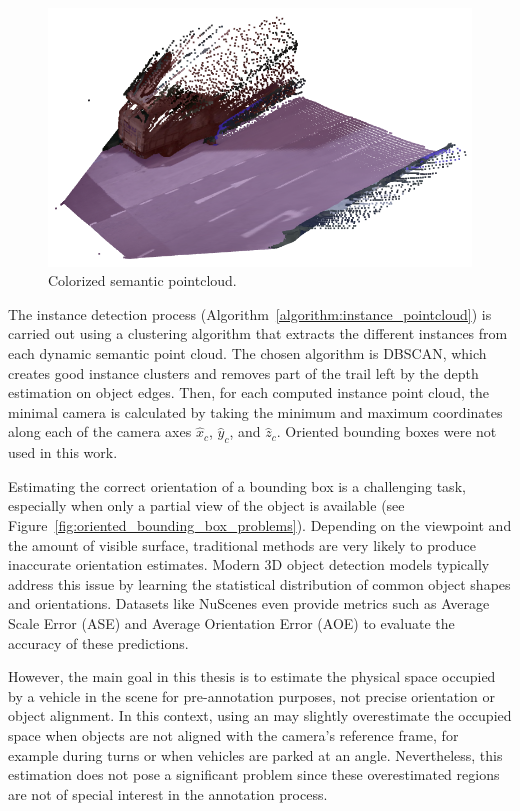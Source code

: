 \begin{figure}[h!]
    \centering
    \includegraphics[width=0.7\linewidth]{images/methodology/pcd_semantic.png}
    \caption{Colorized semantic pointcloud.}
    \label{fig:semantic_pointcloud}
\end{figure}

The instance detection process (Algorithm~\ref{algorithm:instance_pointcloud}) is carried out using a clustering algorithm that extracts the different instances from each dynamic semantic point cloud. The chosen algorithm is DBSCAN, which creates good instance clusters and removes part of the trail left by the depth estimation on object edges. Then, for each computed instance point cloud, the minimal camera  is calculated by taking the minimum and maximum coordinates along each of the camera axes $\hat{x}_c$, $\hat{y}_c$, and $\hat{z}_c$. Oriented bounding boxes were not used in this work.

Estimating the correct orientation of a bounding box is a challenging task, especially when only a partial view of the object is available (see Figure~\ref{fig:oriented_bounding_box_problems}). Depending on the viewpoint and the amount of visible surface, traditional methods are very likely to produce inaccurate orientation estimates. Modern 3D object detection models typically address this issue by learning the statistical distribution of common object shapes and orientations. Datasets like NuScenes even provide metrics such as Average Scale Error (ASE) and Average Orientation Error (AOE) to evaluate the accuracy of these predictions.

However, the main goal in this thesis is to estimate the physical space occupied by a vehicle in the scene for pre-annotation purposes, not precise orientation or object alignment. In this context, using an  may slightly overestimate the occupied space when objects are not aligned with the camera's reference frame, for example during turns or when vehicles are parked at an angle. Nevertheless, this estimation does not pose a significant problem since these overestimated regions are not of special interest in the annotation process.

